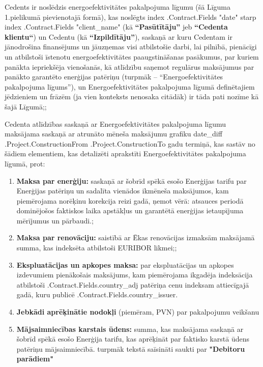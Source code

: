 \documentclass[a4paper]{article}
\begin{document}
Cedents ir noslēdzis energoefektivitātes pakalpojuma līgumu (šā Līguma 1.pielikumā pievienotajā formā),
kas noslēgts
{{index .Contract.Fields "date"}} starp {{index .Contract.Fields "client_name"}}
(kā \textbf{“Pasūtītāju”} jeb \textbf{“Cedenta klientu“}) un Cedentu (kā \textbf{“Izpildītāju”}),
saskaņā ar kuru Cedentam ir jānodrošina finansējums un jāuzņemas visi atbilstošie darbi, lai pilnībā,
pienācīgi un atbilstoši īstenotu energoefektivitātes paaugstināšanas pasākumus, par kuriem panākta
iepriekšēja vienošanās, kā atlīdzību saņemot regulārus maksājumus par panākto garantēto enerģijas
patēriņu (turpmāk – “Energoefektivitātes pakalpojuma līgums”), un Energoefektivitātes pakalpojuma
līgumā definētajiem jēdzieniem un frāzēm (ja vien konteksts nenosaka citādāk) ir tāda pati nozīme kā šajā
Līgumā;;\par

\vspace{5mm}

Cedenta atlīdzības saskaņā ar Energoefektivitātes pakalpojuma līgumu maksājama saskaņā ar atrunāto
mēneša maksājumu grafiku  {{date_diff .Project.ConstructionFrom .Project.ConstructionTo}}
gadu termiņā, kas sastāv no šādiem elementiem, kas detalizēti aprakstīti
Energoefektivitātes pakalpojuma līgumā, prot:\par

\vspace{5mm}

\begin{enumerate}
\item{\textbf{Maksa par enerģiju:} saskaņā ar šobrīd spēkā esošo Enerģijas tarifu par Enerģijas patēriņu un
sadalīta vienādos ikmēneša maksājumos, kam piemērojama norēķinu korekcija reizi gadā, ņemot
vērā: atsauces periodā dominējošos faktiskos laika apstākļus un garantētā enerģijas ietaupījuma
mērījumus un pārbaudi.;}

\item{\textbf{Maksa par renovāciju:} saistībā ar Ēkas renovācijas izmaksām maksājamā summa, kas indeksēta
atbilstoši EURIBOR likmei;;}

\item{\textbf{Ekspluatācijas un apkopes maksa:} par ekspluatācijas un apkopes izdevumiem pienākošais
maksājums, kam piemērojama ikgadēja indeksācija atbilstoši {{.Contract.Fields.country_adj}} patēriņa cenu indeksam
attiecīgajā gadā, kuru publicē {{.Contract.Fields.country_issuer}}.}

\item{\textbf{Jebkādi aprēķinātie nodokļi} (piemēram, PVN) par pakalpojumu veikšanu}

\item{\textbf{Mājsaimniecības karstais ūdens:} summa, kas maksājama saskaņā ar šobrīd spēkā esošo Enerģija
tarifu, kas aprēķināt par faktisko karstā ūdens patēriņu mājsaimniecībā.
turpmāk tekstā saīsināti saukti par
\textbf{"Debitoru parādiem"}}
\end{enumerate}
\end{document}
